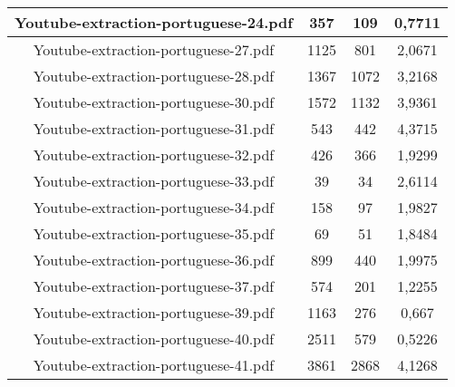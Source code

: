\documentclass[11pt]{article}
\newlength\mylength
\begin{document}
\begin{center}
\begin{longtable}{||C{.40\mylength}||C{.30\mylength}||C{.30\mylength}||C{.30\mylength}||}
  Youtube-extraction-portuguese-24.pdf & 357 & 109 & 0,7711 \\  \hline
  Youtube-extraction-portuguese-27.pdf & 1125 & 801 & 2,0671 \\  \hline
  Youtube-extraction-portuguese-28.pdf & 1367 & 1072 & 3,2168 \\  \hline
  Youtube-extraction-portuguese-30.pdf & 1572 & 1132 & 3,9361 \\  \hline
  Youtube-extraction-portuguese-31.pdf & 543 & 442 & 4,3715 \\  \hline
  Youtube-extraction-portuguese-32.pdf & 426 & 366 & 1,9299 \\  \hline
  Youtube-extraction-portuguese-33.pdf & 39 & 34 & 2,6114 \\  \hline
  Youtube-extraction-portuguese-34.pdf & 158 & 97 & 1,9827 \\  \hline
  Youtube-extraction-portuguese-35.pdf & 69 & 51 & 1,8484 \\  \hline
  Youtube-extraction-portuguese-36.pdf & 899 & 440 & 1,9975 \\  \hline
  Youtube-extraction-portuguese-37.pdf & 574 & 201 & 1,2255 \\  \hline
  Youtube-extraction-portuguese-39.pdf & 1163 & 276 & 0,667 \\  \hline
  Youtube-extraction-portuguese-40.pdf & 2511 & 579 & 0,5226 \\  \hline
  Youtube-extraction-portuguese-41.pdf & 3861 & 2868 & 4,1268 \\  \hline

\end{longtable}
\end{center}
\end{document}

